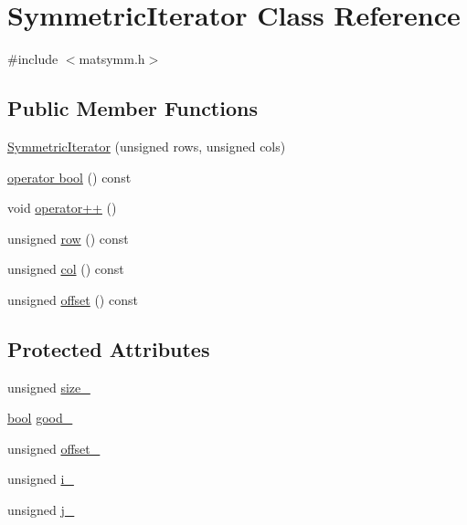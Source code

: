 \hypertarget{classSymmetricIterator}{}\section{Symmetric\+Iterator Class Reference}
\label{classSymmetricIterator}


{\ttfamily \#include $<$matsymm.\+h$>$}

\subsection*{Public Member Functions}
\begin{DoxyCompactItemize}
\item 
\hyperlink{classSymmetricIterator_a4a971b769c786a33bfd232d0ddc4c2f3}{Symmetric\+Iterator} (unsigned rows, unsigned cols)
\item 
\hyperlink{classSymmetricIterator_a92b93ce1b9d57e22daf368fa3fac5229}{operator bool} () const 
\item 
void \hyperlink{classSymmetricIterator_a15df0301b7441940924c1bfe3fa3b174}{operator++} ()
\item 
unsigned \hyperlink{classSymmetricIterator_ac0960c71e1d65e41ba6734abcc899d67}{row} () const 
\item 
unsigned \hyperlink{classSymmetricIterator_ac8d6d51aa7730fc2e2758618150216e8}{col} () const 
\item 
unsigned \hyperlink{classSymmetricIterator_a0b295d3cae80c7da110705b63d84c30c}{offset} () const 
\end{DoxyCompactItemize}
\subsection*{Protected Attributes}
\begin{DoxyCompactItemize}
\item 
unsigned \hyperlink{classSymmetricIterator_af20fec83b924fece2f18e16e64d1d158}{size\+\_\+}
\item 
\hyperlink{compiler_8h_abb452686968e48b67397da5f97445f5b}{bool} \hyperlink{classSymmetricIterator_a7834372e8d347ba7c7889b5237fc5f90}{good\+\_\+}
\item 
unsigned \hyperlink{classSymmetricIterator_a5816a2db16fb9fb1067d83f5fa35baa4}{offset\+\_\+}
\item 
unsigned \hyperlink{classSymmetricIterator_ac592bd5ebb045c0ef23511d26f89fefe}{i\+\_\+}
\item 
unsigned \hyperlink{classSymmetricIterator_a51d98d28b3de3b6719c74960a151d3a4}{j\+\_\+}
\end{DoxyCompactItemize}


